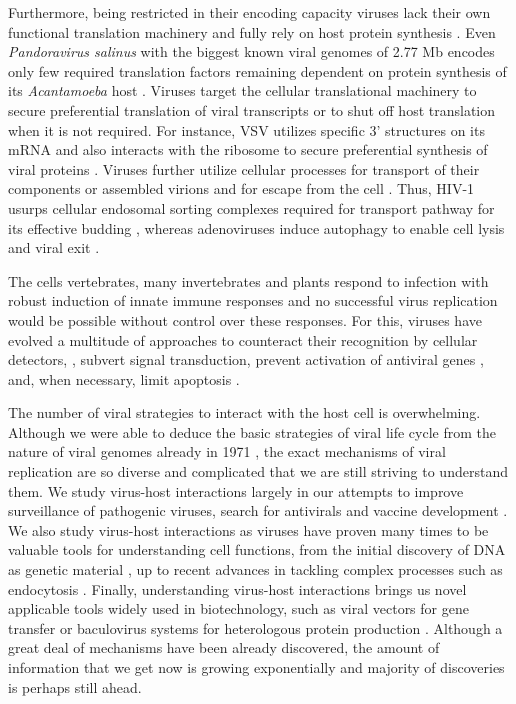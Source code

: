 	Furthermore, being restricted in their encoding capacity viruses lack their own functional translation machinery and fully rely on host protein synthesis \parencite{Walsh2011}. Even \textit{Pandoravirus salinus} with the biggest known viral genomes of 2.77 \gls{Mb} encodes only few required translation factors remaining dependent on protein synthesis of its \textit{Acantamoeba} host \parencite{Philippe2013}. Viruses target the cellular translational machinery to secure preferential translation of viral transcripts or to shut off host translation when it is not required. For instance, \gls{VSV} utilizes specific 3' structures on its mRNA and also interacts with the ribosome to secure preferential synthesis of viral proteins \parencite{Whitlow2006, Lee2013}. Viruses further utilize cellular processes for transport of their components or assembled virions and for escape from the cell \parencite{Bartenschlager2011, Lyles2013}. Thus, HIV-1 usurps cellular endosomal sorting complexes required for transport pathway for its effective budding \parencite{Morita2011}, whereas adenoviruses induce autophagy to enable cell lysis and viral exit \parencite{Jiang2011}.
	
	The cells vertebrates, many invertebrates and plants respond to infection with robust induction of innate immune responses and no successful virus replication would be possible without control over these responses. For this, viruses have evolved a multitude of approaches to counteract their recognition by cellular detectors, \parencite{Zinzula2013}, subvert signal transduction, prevent activation of antiviral genes \parencite{Short2009}, and, when necessary, limit apoptosis \parencite{Galluzzi2008}.
	
	The number of viral strategies to interact with the host cell is overwhelming. Although we were able to deduce the basic strategies of viral life cycle from the nature of viral genomes already in 1971 \parencite{Baltimore1971}, the exact mechanisms of viral replication are so diverse and complicated that we are still striving to understand them. We study virus-host interactions largely in our attempts to improve surveillance of pathogenic viruses, search for antivirals and vaccine development \parencite{Webby2003, Schwegmann2008}. We also study virus-host interactions as viruses have proven many times to be valuable tools for understanding cell functions, from the initial discovery of DNA as genetic material \parencite{Hershey1952}, up to recent advances in tackling complex processes such as endocytosis \parencite{Pelkmans2003}. Finally, understanding virus-host interactions brings us novel applicable tools widely used in biotechnology, such as viral vectors for gene transfer \parencite{Vannucci2013} or baculovirus systems for heterologous protein production \parencite{VanOers2011}. Although a great deal of mechanisms have been already discovered, the amount of information that we get now is growing exponentially and majority of discoveries is perhaps still ahead. 
		
